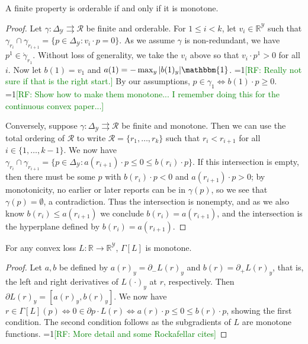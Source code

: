 \documentclass[11pt]{colt2019}
\newcommand{\Comments}{1}
\newcommand{\mynote}[2]{\ifnum\Comments=1\textcolor{#1}{#2}\fi}
\newcommand{\raf}[1]{\mynote{green}{[RF: #1]}}
\newcommand{\reals}{\mathbb{R}}
\newcommand{\prop}[1]{\Gamma[#1]}
\newcommand{\simplex}{\Delta_\Y}
\newcommand{\R}{\mathcal{R}}
\newcommand{\Y}{\mathcal{Y}}
\newcommand{\inter}[1]{\mathring{#1}}%
\newcommand{\toto}{\rightrightarrows}
\newcommand{\ones}{\mathbbm{1}}
\begin{document}
\begin{lemma}\label{lem:orderable-monotone}
  A finite property is orderable if and only if it is monotone.
\end{lemma}
\begin{proof}
  Let $\gamma:\simplex\toto\R$ be finite and orderable.
  For $1 \leq i < k$, let $v_i\in\reals^\Y$ such that $\gamma_{r_i} \cap \gamma_{r_{i+1}} = \{p\in\simplex : v_i\cdot p = 0\}$.
  As we assume $\gamma$ is non-redundant, we have $p^1 \in \inter\gamma_{r_1}$.
  Without loss of generality, we take the $v_i$ above so that $v_i \cdot p^1 > 0$ for all $i$.
  Now let $b(1) = v_1$ and $a(1) = -\max_y |b(1)_y|\ones$.
  \raf{Really not sure if that is the right start.}
  By our assumptions, $p \in \gamma_1 \iff b(1) \cdot p \geq 0$.
  \raf{Show how to make them monotone... I remember doing this for the continuous convex paper...}

  Conversely, suppose $\gamma:\simplex\toto\R$ be finite and monotone.
  Then we can use the total ordering of $\R$ to write $\R = \{r_1,\ldots,r_k\}$ such that $r_i < r_{i+1}$ for all $i \in \{1,\ldots,k-1\}$.
  We now have $\gamma_{r_i} \cap \gamma_{r_{i+1}} = \{p\in\simplex : a(r_{i+1}) \cdot p \leq 0 \leq b(r_i) \cdot p\}$.
  If this intersection is empty, then there must be some $p$ with $b(r_i) \cdot p < 0$ and $a(r_{i+1}) \cdot p > 0$; by monotonicity, no earlier or later reports can be in $\gamma(p)$, so we see that $\gamma(p) = \emptyset$, a contradiction.
  Thus the intersection is nonempty, and as we also know $b(r_i) \leq a(r_{i+1})$ we conclude $b(r_i) = a(r_{i+1})$, and the intersection is the hyperplane defined by $b(r_i) = a(r_{i+1})$.
\end{proof}

\begin{lemma}\label{lem:prop-L-monotone}
  For any convex loss $L : \reals \to \reals^\Y$, $\prop{L}$ is monotone.
\end{lemma}
\begin{proof}
  Let $a,b$ be defined by $a(r)_y = \partial_- L(r)_y$ and $b(r) = \partial_+ L(r)_y$, that is, the left and right derivatives of $L(\cdot)_y$ at $r$, respectively.
  Then $\partial L(r)_y = [a(r)_y,b(r)_y]$.
  We now have $r \in \prop{L}(p) \iff 0 \in \partial p\cdot L(r) \iff a(r)\cdot p \leq 0 \leq b(r) \cdot p$, showing the first condition.
  The second condition follows as the subgradients of $L$ are monotone functions.
  \raf{More detail and some Rockafellar cites}
\end{proof}
\end{document}
